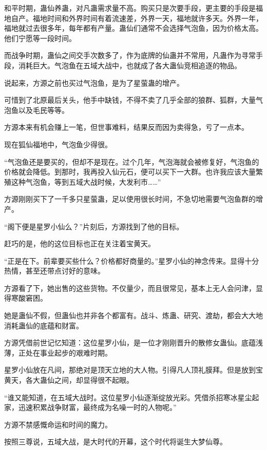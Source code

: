 
\begin{this_body}

和平时期，蛊仙养蛊，对凡蛊需求量不高。购买只是次要手段，更主要的手段是福地自产。福地时间和外界时间有着流速差，外界一天，福地就许多天。外界一年，福地就过去很多年，每年都有产量。蛊仙们通常不会选择气泡鱼，因为价格太高。他们宁愿等一段时间。

而战争时期，蛊仙之间交手次数多了，作为底牌的仙蛊并不常用，凡蛊作为寻常手段，消耗巨大。气泡鱼在五域大战中，也就成了各大蛊仙竞相追逐的物品。

说起来，方源之前也买过气泡鱼，是为了星萤蛊的增产。

可惜到了北原最后关头，他手中缺钱，不得不卖了几乎全部的狼群、狐群，大量气泡鱼以及毛民等等。

方源本来有机会赚上一笔，但世事难料，结果反而因为卖得急，亏了一点本。

现在狐仙福地中，气泡鱼少得很。

“气泡鱼还是要买的，但却不是现在。过个几年，气泡海就会被修复好，气泡鱼的价格就会降低。到那时，我再投入仙元石，便可以买下一大群。也许我应该大量繁殖这种气泡鱼，等到五域大战时候，大发利市……”

方源刚刚买下了一千多只星萤蛊，足以使用很长时间，不急切地需要气泡鱼群的增产。

“阁下便是星罗小仙么？”片刻后，方源找到了他的目标。

赶巧的是，他的这位目标也正在关注着宝黄天。

“正是在下。前辈要买些什么？价格都好商量的。”星罗小仙的神念传来。显得十分热情，甚至还带点讨好的意味。

方源看了下，她出售的这些货物。不仅量少，而且很常见，基本上无人会问津，显得寒酸窘困。

她是蛊仙不假，但蛊仙也并非各个都富有。战斗、炼蛊、研究、渡劫，都会大大地消耗蛊仙的底蕴和财富。

方源凭借前世记忆知道：这位星罗小仙，是一位才刚刚晋升的散修女蛊仙。底蕴浅薄，正处在事业起步的艰难时期。

星罗小仙放在凡间，那绝对是顶天立地的大人物。引得凡人顶礼膜拜。但是放到宝黄天，各大蛊仙之间，却显得很不起眼。

“谁又能知道，在五域大战时。这位星罗小仙逐渐绽放光彩。凭借杀招寒冰星尘起家，迅速积累战争财富，最终成为名噪一时的人物呢。”

方源不禁感慨命运和时间的魔力。

按照三尊说，五域大战，是大时代的开幕，这个时代将诞生大梦仙尊。


\end{this_body}
